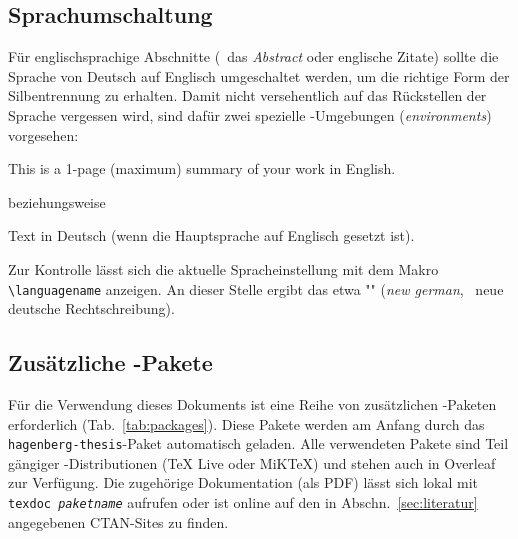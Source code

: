 \subsection{Sprachumschaltung}
\label{sec:sprachumschaltung}

Für englischsprachige Abschnitte (\zB\ das \emph{Abstract} oder englische Zitate)
sollte die Sprache von Deutsch auf Englisch umgeschaltet werden, um
die richtige Form der Silbentrennung zu erhalten. Damit nicht versehentlich
auf das Rückstellen der Sprache vergessen wird, sind dafür zwei spezielle
\latex-Umgebungen (\emph{environments}) vorgesehen:
%
\begin{LaTeXCode}[numbers=none]
\begin{english}
	This is a 1-page (maximum) summary of your work in English.
\end{english}
\end{LaTeXCode}
%
beziehungsweise
%
\begin{LaTeXCode}[numbers=none]
\begin{german}
	Text in Deutsch (wenn die Hauptsprache auf Englisch gesetzt ist).
\end{german}
\end{LaTeXCode}
%
Zur Kontrolle lässt sich die aktuelle Spracheinstellung mit dem Makro
\verb!\languagename! anzeigen. An dieser Stelle ergibt das etwa
"\texttt{\languagename}" (\emph{new german}, \dah\ neue deutsche
Rechtschreibung).

\subsection{Zusätzliche {\latex}-Pakete}

Für die Verwendung dieses Dokuments ist eine Reihe von zusätzlichen
\latex-Paketen erforderlich (Tab.~\ref{tab:packages}). Diese Pakete werden am
Anfang durch das \texttt{hagenberg-thesis}-Paket automatisch geladen. Alle
verwendeten Pakete sind Teil gängiger \latex-Dis\-tri\-bu\-tio\-nen (\zB TeX Live
oder MiKTeX) und stehen auch in \textsf{Overleaf} zur Verfügung. Die
zugehörige Dokumentation (als PDF) lässt sich lokal mit
\texttt{texdoc \emph{paketname}} aufrufen oder ist online auf den in
Abschn.~\ref{sec:literatur} angegebenen CTAN-Sites zu finden.

